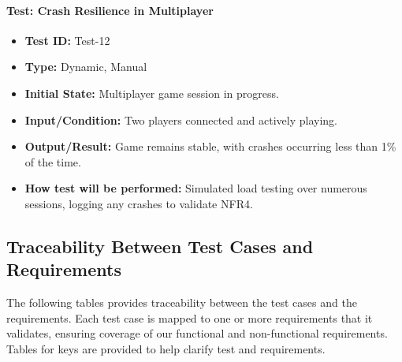 \documentclass[12pt, titlepage]{article}
\begin{document}
\paragraph{\label{test-12}Test: Crash Resilience in Multiplayer}
\begin{itemize}
    \item \textbf{Test ID:} Test-12
    \item \textbf{Type:} Dynamic, Manual
    \item \textbf{Initial State:} Multiplayer game session in progress.
    \item \textbf{Input/Condition:} Two players connected and actively playing.
    \item \textbf{Output/Result:} Game remains stable, with crashes occurring less than 1\% of the time.
    \item \textbf{How test will be performed:} Simulated load testing over numerous sessions, logging any crashes to validate NFR4.
\end{itemize}

\newpage
\subsection{Traceability Between Test Cases and Requirements}

The following tables provides traceability between the test cases and the requirements. Each test case is mapped to one or more requirements that it validates, ensuring coverage of our functional and non-functional requirements. Tables for keys are provided to help clarify test and requirements.
\end{document}
